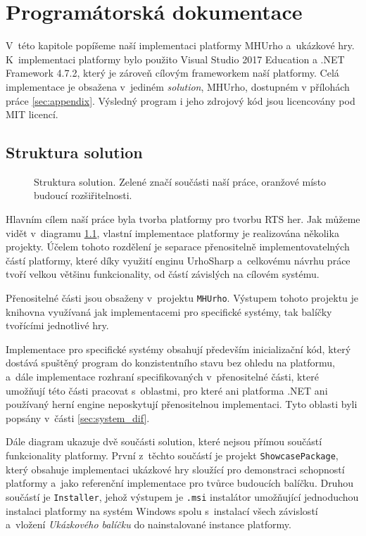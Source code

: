 \chapter{Programátorská dokumentace}
V~této kapitole popíšeme naší implementaci platformy MHUrho a~ukázkové hry. K~implementaci platformy bylo použito Visual Studio 2017 Education a .NET Framework 4.7.2, který je zároveň cílovým frameworkem naší platformy. Celá implementace je obsažena v~jediném \textit{solution}, MHUrho, dostupném v přílohách práce \ref{sec:appendix}. Výsledný program i jeho zdrojový kód jsou licencovány pod MIT licencí.

\section{Struktura solution}

\begin{figure}[h]
	\centering
	\fontsize{10pt}{11pt}\selectfont
	\def\svgwidth{0.9\textwidth}
	
	\caption{Struktura solution. Zelené značí součásti naší práce, oranžové místo budoucí rozšiřitelnosti.}
	\label{fig:solution_structure}
\end{figure}

Hlavním cílem naší práce byla tvorba platformy pro tvorbu RTS her. Jak můžeme vidět v~diagramu \ref{fig:solution_structure}, vlastní implementace platformy je realizována několika projekty. Účelem tohoto rozdělení je separace přenositelně implementovatelných částí platformy, které díky využití enginu UrhoSharp a~celkovému návrhu práce tvoří velkou většinu funkcionality, od částí závislých na cílovém systému. 

Přenositelné části jsou obsaženy v~projektu \texttt{MHUrho}. Výstupem tohoto projektu je knihovna využívaná jak implementacemi pro specifické systémy, tak balíčky tvořícími jednotlivé hry. 

Implementace pro specifické systémy obsahují především inicializační kód, který dostává spuštěný program do konzistentního stavu bez ohledu na platformu, a~dále implementace rozhraní specifikovaných v~přenositelné části, které umožňují této části pracovat s~oblastmi, pro které ani platforma .NET ani používaný herní engine neposkytují přenositelnou implementaci. Tyto oblasti byli popsány v~části \ref{sec:system_dif}.

Dále diagram ukazuje dvě součásti solution, které nejsou přímou součástí funkcionality platformy. První z~těchto součástí je projekt \texttt{ShowcasePackage}, který obsahuje implementaci ukázkové hry sloužící pro demonstraci schopností platformy a~jako referenční implementace pro tvůrce budoucích balíčku. Druhou součástí je \texttt{Installer}, jehož výstupem je \texttt{.msi} instalátor umožňující jednoduchou instalaci platformy na systém Windows spolu s~instalací všech závislostí a~vložení \textit{Ukázkového balíčku} do nainstalované instance platformy.

